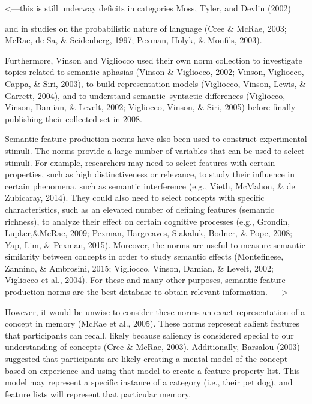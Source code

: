 \documentclass[english,man]{apa6}
\theoremstyle{definition}
\theoremstyle{definition}
\theoremstyle{definition}
\theoremstyle{remark}
\begin{document}
\textless{}---this is still underway deficits in categories Moss, Tyler,
and Devlin (2002)

and in studies on the probabilistic nature of language (Cree \& McRae,
2003; McRae, de Sa, \& Seidenberg, 1997; Pexman, Holyk, \& Monfils,
2003).

Furthermore, Vinson and Vigliocco used their own norm collection to
investigate topics related to semantic aphasias (Vinson \& Vigliocco,
2002; Vinson, Vigliocco, Cappa, \& Siri, 2003), to build representation
models (Vigliocco, Vinson, Lewis, \& Garrett, 2004), and to understand
semantic--syntactic differences (Vigliocco, Vinson, Damian, \& Levelt,
2002; Vigliocco, Vinson, \& Siri, 2005) before finally publishing their
collected set in 2008.

Semantic feature production norms have also been used to construct
experimental stimuli. The norms provide a large number of variables that
can be used to select stimuli. For example, researchers may need to
select features with certain properties, such as high distinctiveness or
relevance, to study their influence in certain phenomena, such as
semantic interference (e.g., Vieth, McMahon, \& de Zubicaray, 2014).
They could also need to select concepts with specific characteristics,
such as an elevated number of defining features (semantic richness), to
analyze their effect on certain cognitive processes (e.g., Grondin,
Lupker,\&McRae, 2009; Pexman, Hargreaves, Siakaluk, Bodner, \& Pope,
2008; Yap, Lim, \& Pexman, 2015). Moreover, the norms are useful to
measure semantic similarity between concepts in order to study semantic
effects (Montefinese, Zannino, \& Ambrosini, 2015; Vigliocco, Vinson,
Damian, \& Levelt, 2002; Vigliocco et al., 2004). For these and many
other purposes, semantic feature production norms are the best database
to obtain relevant information. ----\textgreater{}

However, it would be unwise to consider these norms an exact
representation of a concept in memory (McRae et al., 2005). These norms
represent salient features that participants can recall, likely because
saliency is considered special to our understanding of concepts (Cree \&
McRae, 2003). Additionally, Barsalou (2003) suggested that participants
are likely creating a mental model of the concept based on experience
and using that model to create a feature property list. This model may
represent a specific instance of a category (i.e., their pet dog), and
feature lists will represent that particular memory.
\end{document}
